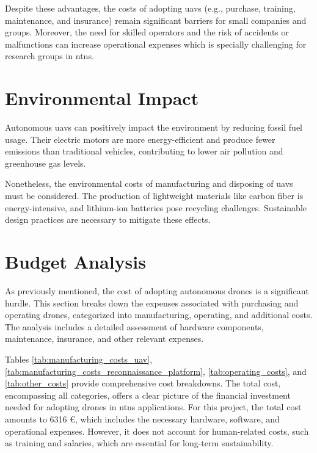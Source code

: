 Despite these advantages, the costs of adopting \glspl{uav} (e.g., purchase, training, maintenance, and insurance) remain significant barriers for small companies and groups. Moreover, the need for skilled operators and the risk of accidents or malfunctions can increase operational expenses which is specially challenging for research groups in \glspl{ntn}.

\section{Environmental Impact}\label{sec:environmental_impact}

Autonomous \glspl{uav} can positively impact the environment by reducing fossil fuel usage. Their electric motors are more energy-efficient and produce fewer emissions than traditional vehicles, contributing to lower air pollution and greenhouse gas levels.

Nonetheless, the environmental costs of manufacturing and disposing of \glspl{uav} must be considered. The production of lightweight materials like carbon fiber is energy-intensive, and lithium-ion batteries pose recycling challenges. Sustainable design practices are necessary to mitigate these effects.

\section{Budget Analysis}\label{sec:budget_analysis}

As previously mentioned, the cost of adopting autonomous drones is a significant hurdle. This section breaks down the expenses associated with purchasing and operating drones, categorized into manufacturing, operating, and additional costs. The analysis includes a detailed assessment of hardware components, maintenance, insurance, and other relevant expenses.

Tables \cref{tab:manufacturing_costs_uav}, \cref{tab:manufacturing_costs_reconnaissance_platform}, \cref{tab:operating_costs}, and \cref{tab:other_costs} provide comprehensive cost breakdowns. The total cost, encompassing all categories, offers a clear picture of the financial investment needed for adopting drones in \glspl{ntn} applications. For this project, the total cost amounts to 6316 \euro, which includes the necessary hardware, software, and operational expenses. However, it does not account for human-related costs, such as training and salaries, which are essential for long-term sustainability.

